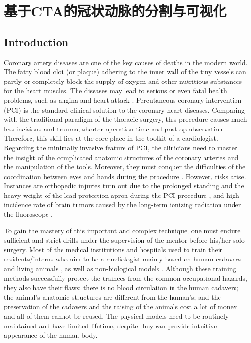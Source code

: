 \chapter{基于CTA的冠状动脉的分割与可视化}
\label{chap5}

\section{Introduction}

Coronary artery diseases are one of the key causes of deaths in the modern world. %
The fatty blood clot (or plaque) adhering to the inner wall of the tiny vessels can partly or completely block the supply of oxygen and other nutritious substances for the heart muscles.
The diseases may lead to serious or even fatal health problems, such as angina and heart attack \cite{OCallaghan2002}.
Percutaneous coronary intervention (PCI) is the standard clinical solution to the coronary heart diseases.
Comparing with the traditional paradigm of the thoracic surgery, this procedure causes much less incisions and trauma, shorter operation time and post-op observation.
Therefore, this skill lies at the core place in the toolkit of a cardiologist.
Regarding the minimally invasive feature of PCI, the clinicians need to master the insight of the complicated anatomic structures of the coronary arteries and the manipulation of the tools.
Moreover, they must conquer the difficulties of the coordination between eyes and hands during the procedure \cite{Li2012CUHK}.
However, risks arise.
Instances are orthopedic injuries turn out due to the prolonged standing and the heavy weight of the lead protection apron during the PCI procedure \cite{Goldstein2004}, and high incidence rate of brain tumors caused by the long-term ionizing radiation under the fluoroscope \cite{Roguin2012}.

To gain the mastery of this important and complex technique, one must endure sufficient and strict drills under the supervision of the mentor before his/her solo surgery.
Most of the medical institutions and hospitals used to train their residents/interns who aim to be a cardiologist mainly based on human cadavers and living animals \cite{Lunderquist1995}, as well as non-biological models \cite{Mori1998}.
Although these training methods successfully protect the trainees from the common occupational hazards, they also have their flaws:
there is no blood circulation in the human cadavers;
the animal's anatomic structures are different from the human's;
and the preservation of the cadavers and the raising of the animals cost a lot of money and all of them cannot be reused.
The physical models need to be routinely maintained and have limited lifetime, despite they can provide intuitive appearance of the human body.

